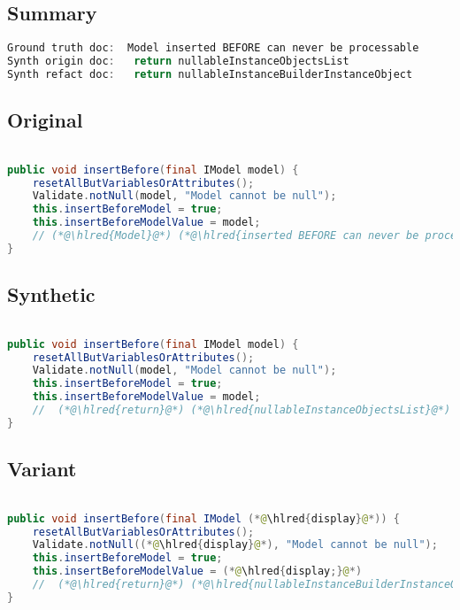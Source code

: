 \documentclass[11pt]{article}
\DeclareRobustCommand{\hlred}[1]{{\sethlcolor{YellowOrange}\hl{#1}}}
\begin{document}
\subsection{Summary}

\begin{lstlisting}[language=java]
Ground truth doc:  Model inserted BEFORE can never be processable
Synth origin doc:   return nullableInstanceObjectsList
Synth refact doc:   return nullableInstanceBuilderInstanceObject
\end{lstlisting}

\subsection{Original}
\begin{lstlisting}[language=java]

public void insertBefore(final IModel model) {
    resetAllButVariablesOrAttributes();
    Validate.notNull(model, "Model cannot be null");
    this.insertBeforeModel = true;
    this.insertBeforeModelValue = model;
    // (*@\hlred{Model}@*) (*@\hlred{inserted BEFORE can never be processable}@*)
}
\end{lstlisting}
\subsection{Synthetic}

\begin{lstlisting}[language=java]

public void insertBefore(final IModel model) {
    resetAllButVariablesOrAttributes();
    Validate.notNull(model, "Model cannot be null");
    this.insertBeforeModel = true;
    this.insertBeforeModelValue = model;
    //  (*@\hlred{return}@*) (*@\hlred{nullableInstanceObjectsList}@*)
}
\end{lstlisting}

\subsection{Variant}

\begin{lstlisting}[language=java]

public void insertBefore(final IModel (*@\hlred{display}@*)) {
    resetAllButVariablesOrAttributes();
    Validate.notNull((*@\hlred{display}@*), "Model cannot be null");
    this.insertBeforeModel = true;
    this.insertBeforeModelValue = (*@\hlred{display;}@*)
    //  (*@\hlred{return}@*) (*@\hlred{nullableInstanceBuilderInstanceObject}@*)
}
\end{lstlisting}
\end{document}
